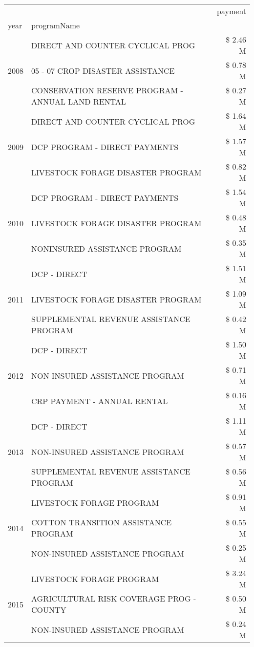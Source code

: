 \begin{tabular}{llr}
\toprule
 &  & payment \\
year & programName &  \\
\midrule
\multirow[t]{3}{*}{2008} & DIRECT AND COUNTER CYCLICAL PROG & \$ 2.46 M \\
 & 05 - 07 CROP DISASTER ASSISTANCE & \$ 0.78 M \\
 & CONSERVATION RESERVE PROGRAM - ANNUAL LAND RENTAL & \$ 0.27 M \\
\cline{1-3}
\multirow[t]{3}{*}{2009} & DIRECT AND COUNTER CYCLICAL PROG & \$ 1.64 M \\
 & DCP PROGRAM - DIRECT PAYMENTS & \$ 1.57 M \\
 & LIVESTOCK FORAGE DISASTER  PROGRAM & \$ 0.82 M \\
\cline{1-3}
\multirow[t]{3}{*}{2010} & DCP PROGRAM - DIRECT PAYMENTS & \$ 1.54 M \\
 & LIVESTOCK FORAGE DISASTER  PROGRAM & \$ 0.48 M \\
 & NONINSURED ASSISTANCE PROGRAM & \$ 0.35 M \\
\cline{1-3}
\multirow[t]{3}{*}{2011} & DCP - DIRECT & \$ 1.51 M \\
 & LIVESTOCK FORAGE DISASTER PROGRAM & \$ 1.09 M \\
 & SUPPLEMENTAL REVENUE ASSISTANCE PROGRAM & \$ 0.42 M \\
\cline{1-3}
\multirow[t]{3}{*}{2012} & DCP - DIRECT & \$ 1.50 M \\
 & NON-INSURED ASSISTANCE PROGRAM & \$ 0.71 M \\
 & CRP PAYMENT - ANNUAL RENTAL & \$ 0.16 M \\
\cline{1-3}
\multirow[t]{3}{*}{2013} & DCP - DIRECT & \$ 1.11 M \\
 & NON-INSURED ASSISTANCE PROGRAM & \$ 0.57 M \\
 & SUPPLEMENTAL REVENUE ASSISTANCE PROGRAM & \$ 0.56 M \\
\cline{1-3}
\multirow[t]{3}{*}{2014} & LIVESTOCK FORAGE PROGRAM & \$ 0.91 M \\
 & COTTON TRANSITION ASSISTANCE PROGRAM & \$ 0.55 M \\
 & NON-INSURED ASSISTANCE PROGRAM & \$ 0.25 M \\
\cline{1-3}
\multirow[t]{3}{*}{2015} & LIVESTOCK FORAGE PROGRAM & \$ 3.24 M \\
 & AGRICULTURAL RISK COVERAGE PROG - COUNTY & \$ 0.50 M \\
 & NON-INSURED ASSISTANCE PROGRAM & \$ 0.24 M \\

\end{tabular}
